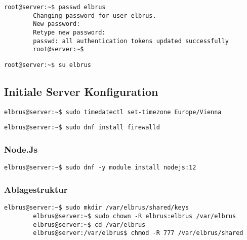 \documentclass{article}
\begin{document}
	\lstset{style=commands}
	\begin{lstlisting}[caption={Ändern des Passwords für den User Elbrus.}]
		root@server:~$ passwd elbrus
		Changing password for user elbrus.
		New password:
		Retype new password:
		passwd: all authentication tokens updated successfully
		root@server:~$
	\end{lstlisting}

	\lstset{style=commands}
	\begin{lstlisting}[caption={Wechseln zu User elbrus.}]
		root@server:~$ su elbrus
	\end{lstlisting}
	\newpage
	
	\subsection{Initiale Server Konfiguration}

	\lstset{style=commands}
	\begin{lstlisting}[caption={Setzen der Zeitzone auf 'Europa/Wien'.}]
		elbrus@server:~$ sudo timedatectl set-timezone Europe/Vienna
	\end{lstlisting}

	\lstset{style=commands}
	\begin{lstlisting}[caption={Installieren von dem 'firewalld' Service.}]
		elbrus@server:~$ sudo dnf install firewalld
	\end{lstlisting}
	
	\subsubsection{Node.Js}
	
	\lstset{style=commands}
	\begin{lstlisting}[caption={Installieren des Framworks 'Node.Js'.}]
		elbrus@server:~$ sudo dnf -y module install nodejs:12
	\end{lstlisting}
	
	\subsubsection{Ablagestruktur}
	
	\lstset{style=commands}
	\begin{lstlisting}[caption={Anlegen der Verzeichnissstruktur.}]
		elbrus@server:~$ sudo mkdir /var/elbrus/shared/keys
		elbrus@server:~$ sudo chown -R elbrus:elbrus /var/elbrus
		elbrus@server:~$ cd /var/elbrus
		elbrus@server:/var/elbrus$ chmod -R 777 /var/elbrus/shared
	\end{lstlisting}
	\newpage
\end{document}
